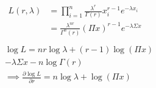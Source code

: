 \documentclass[twocolumn]{article}
\begin{document}
\begin{gather*}
\begin{aligned}
L(r,\lambda)&=\prod_{i=1}^n\frac{\lambda^r}{\Gamma(r)}x_i^{r-1}e^{-\lambda x_i}\\
&=\frac{\lambda^{nr}}{\Gamma^n(r)}(\Pi x)^{r-1}e^{-\lambda\Sigma x}\\
\end{aligned}\\
\log L=nr\log\lambda+(r-1)\log(\Pi x)\\
-\lambda\Sigma x-n\log\Gamma(r)\\
\implies \frac{\partial\log L}{\partial r}=n\log\lambda+\log(\Pi x)
\end{gather*}

\end{document}

